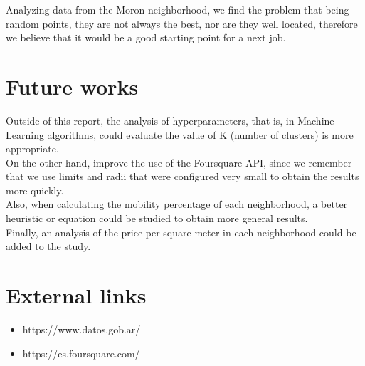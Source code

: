 \documentclass[12pt,a4paper]{tesis}
\begin{document}
Analyzing data from the Moron neighborhood, we find the problem that being random points, they are not always the best, nor are they well located, therefore we believe that it would be a good starting point for a next job.


\chapter{Future works}
Outside of this report, the analysis of hyperparameters, that is, in Machine Learning algorithms, could evaluate the value of K (number of clusters) is more appropriate. \\

On the other hand, improve the use of the Foursquare API, since we remember that we use limits and radii that were configured very small to obtain the results more quickly. \\

Also, when calculating the mobility percentage of each neighborhood, a better heuristic or equation could be studied to obtain more general results. \\

Finally, an analysis of the price per square meter in each neighborhood could be added to the study. \\

\chapter{External links}
\begin{itemize}
\item https://www.datos.gob.ar/
\item https://es.foursquare.com/
\end{itemize}
\end{document}
